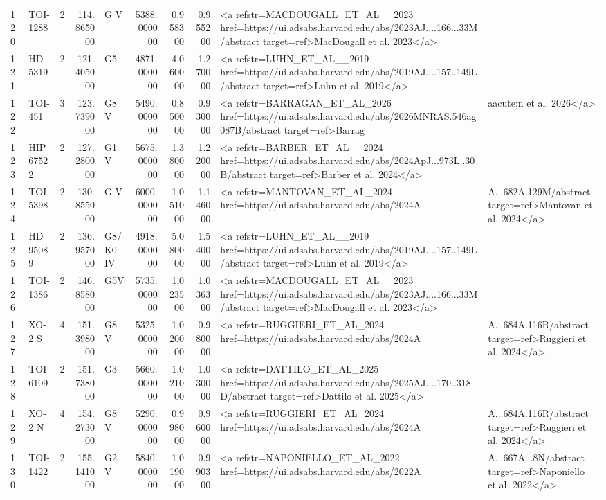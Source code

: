 \begin{tabular}{llrrlrrrl}
120 & TOI-1288 & 2 & 114.865000 & G V & 5388.000000 & 0.958300 & 0.955200 & <a refstr=MACDOUGALL_ET_AL__2023 href=https://ui.adsabs.harvard.edu/abs/2023AJ....166...33M/abstract target=ref>MacDougall et al. 2023</a> \\
121 & HD 5319 & 2 & 121.405000 & G5 & 4871.000000 & 4.060000 & 1.270000 & <a refstr=LUHN_ET_AL__2019 href=https://ui.adsabs.harvard.edu/abs/2019AJ....157..149L/abstract target=ref>Luhn et al. 2019</a> \\
122 & TOI-451 & 3 & 123.739000 & G8 V & 5490.000000 & 0.850000 & 0.930000 & <a refstr=BARRAGAN_ET_AL_2026 href=https://ui.adsabs.harvard.edu/abs/2026MNRAS.546ag087B/abstract target=ref>Barrag&aacute;n et al. 2026</a> \\
123 & HIP 67522 & 2 & 127.280000 & G1 V & 5675.000000 & 1.380000 & 1.220000 & <a refstr=BARBER_ET_AL__2024 href=https://ui.adsabs.harvard.edu/abs/2024ApJ...973L..30B/abstract target=ref>Barber et al. 2024</a> \\
124 & TOI-5398 & 2 & 130.855000 & G V & 6000.000000 & 1.051000 & 1.146000 & <a refstr=MANTOVAN_ET_AL_2024 href=https://ui.adsabs.harvard.edu/abs/2024A&A...682A.129M/abstract target=ref>Mantovan et al. 2024</a> \\
125 & HD 95089 & 2 & 136.957000 & G8/K0 IV & 4918.000000 & 5.080000 & 1.540000 & <a refstr=LUHN_ET_AL__2019 href=https://ui.adsabs.harvard.edu/abs/2019AJ....157..149L/abstract target=ref>Luhn et al. 2019</a> \\
126 & TOI-1386 & 2 & 146.858000 & G5V & 5735.000000 & 1.023500 & 1.036300 & <a refstr=MACDOUGALL_ET_AL__2023 href=https://ui.adsabs.harvard.edu/abs/2023AJ....166...33M/abstract target=ref>MacDougall et al. 2023</a> \\
127 & XO-2 S & 4 & 151.398000 & G8 V & 5325.000000 & 1.020000 & 0.980000 & <a refstr=RUGGIERI_ET_AL_2024 href=https://ui.adsabs.harvard.edu/abs/2024A&A...684A.116R/abstract target=ref>Ruggieri et al. 2024</a> \\
128 & TOI-6109 & 2 & 151.738000 & G3 & 5660.000000 & 1.021000 & 1.030000 & <a refstr=DATTILO_ET_AL_2025 href=https://ui.adsabs.harvard.edu/abs/2025AJ....170..318D/abstract target=ref>Dattilo et al. 2025</a> \\
129 & XO-2 N & 4 & 154.273000 & G8 V & 5290.000000 & 0.998000 & 0.960000 & <a refstr=RUGGIERI_ET_AL_2024 href=https://ui.adsabs.harvard.edu/abs/2024A&A...684A.116R/abstract target=ref>Ruggieri et al. 2024</a> \\
130 & TOI-1422 & 2 & 155.141000 & G2 V & 5840.000000 & 1.019000 & 0.990300 & <a refstr=NAPONIELLO_ET_AL_2022 href=https://ui.adsabs.harvard.edu/abs/2022A&A...667A...8N/abstract target=ref>Naponiello et al. 2022</a> \\

\end{tabular}
